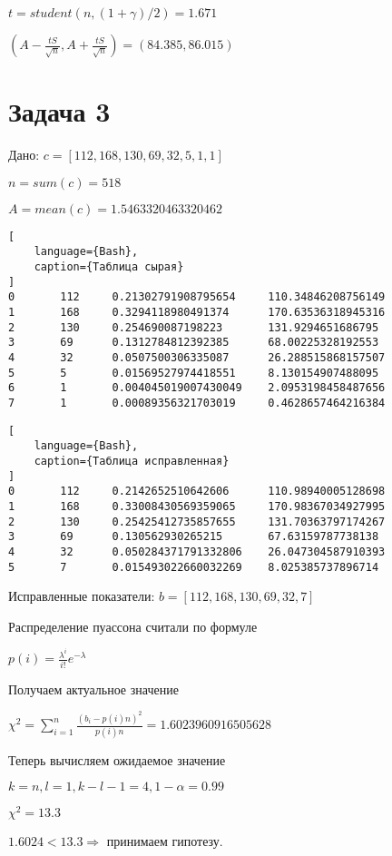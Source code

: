 \documentclass{article}
\begin{document}
$t = student(n, (1 + \gamma) / 2) = 1.671$

$(A - \frac{tS}{\sqrt{n}}, A + \frac{tS}{\sqrt{n}}) = (84.385, 86.015)$

\section{Задача 3}

Дано: $c = [112, 168, 130, 69, 32, 5, 1, 1]$

$n = sum(c) = 518$

$A = mean(c) = 1.5463320463320462$

\begin{lstlisting}[
    language={Bash},
    caption={Таблица сырая}
]
0       112     0.21302791908795654     110.34846208756149
1       168     0.3294118980491374      170.63536318945316
2       130     0.254690087198223       131.9294651686795
3       69      0.1312784812392385      68.00225328192553
4       32      0.0507500306335087      26.288515868157507
5       5       0.01569527974418551     8.130154907488095
6       1       0.004045019007430049    2.0953198458487656
7       1       0.00089356321703019     0.4628657464216384
\end{lstlisting}

\begin{lstlisting}[
    language={Bash},
    caption={Таблица исправленная}
]
0       112     0.2142652510642606      110.98940005128698
1       168     0.33008430569359065     170.98367034927995
2       130     0.25425412735857655     131.70363797174267
3       69      0.130562930265215       67.63159787738138
4       32      0.050284371791332806    26.047304587910393
5       7       0.015493022660032269    8.025385737896714
\end{lstlisting}

Исправленные показатели:
$b = [112, 168, 130, 69, 32, 7]$

Распределение пуассона считали по формуле

$p(i) = \frac{\lambda^i}{i!} e^{-\lambda}$

Получаем актуальное значение

$\chi^2 = \sum_{i=1}^n \frac{(b_i - p(i)n)^2}{p(i)n} = 1.6023960916505628$

Теперь вычисляем ожидаемое значение

$k = n, l = 1, k - l - 1 = 4, 1 - \alpha = 0.99$

$\chi^2 = 13.3$

$1.6024 < 13.3 \Rightarrow $ принимаем гипотезу.
\end{document}
